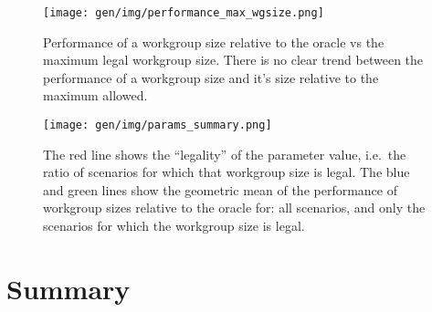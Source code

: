 \begin{figure}
\centering
\texttt{[image: gen/img/performance\_max\_wgsize.png]}
\caption{%
  Performance of a workgroup size relative to the oracle vs the
  maximum legal workgroup size. There is no clear trend between the
  performance of a workgroup size and it's size relative to the
  maximum allowed.%
}
\end{figure}

\begin{figure}
\centering
\texttt{[image: gen/img/params\_summary.png]}
\caption{%
  The red line shows the ``legality'' of the parameter value, i.e.\
  the ratio of scenarios for which that workgroup size is legal.  The
  blue and green lines show the geometric mean of the performance of
  workgroup sizes relative to the oracle for: all scenarios, and only
  the scenarios for which the workgroup size is legal.%
}
\end{figure}


\section{Summary}
